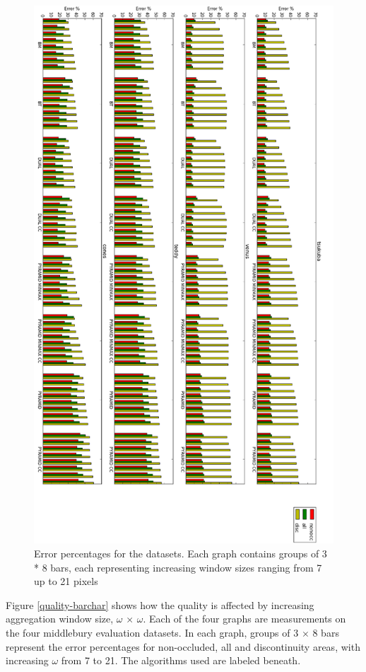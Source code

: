 \begin{figure}
  \centering
  \includegraphics[width=\textwidth,height=\textheight]{images/quality_barchart_flipped.png}
  \caption{Error percentages for the datasets. Each graph contains
    groups of 3 * 8 bars, each representing increasing window sizes
    ranging from 7 up to 21 pixels}
  \label{quality-barchart}
\end{figure}


Figure \ref{quality-barchar} shows how the quality is affected by
increasing aggregation window size, $\omega$ $\times$ $\omega$. Each
of the four graphs are measurements on the four middlebury evaluation
datasets. In each graph, groups of 3 $\times$ 8 bars represent the
error percentages for non-occluded, all and discontinuity areas, with
increasing $\omega$ from 7 to 21. The algorithms used are labeled
beneath.

